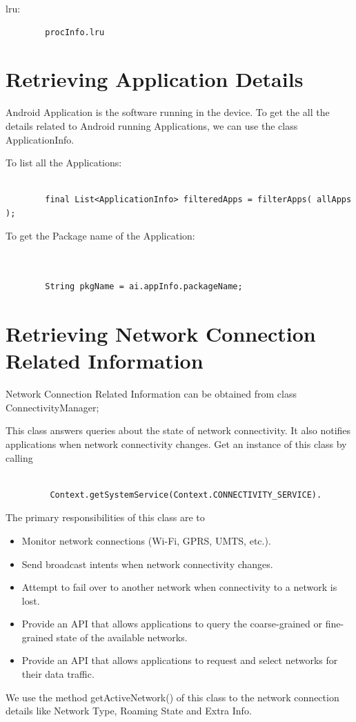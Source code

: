 \documentclass[12pt]{report}
\begin{document}
lru:

\begin{lstlisting}
        procInfo.lru
\end{lstlisting}


\section{Retrieving Application Details}
Android Application is the software running in the device. To get the all the details related to Android running Applications, we can use the class ApplicationInfo. 

To list all the Applications:
\begin{lstlisting}

        final List<ApplicationInfo> filteredApps = filterApps( allApps );
\end{lstlisting}

To get the Package name of the Application:

\begin{lstlisting}


        String pkgName = ai.appInfo.packageName;
\end{lstlisting}

\section{Retrieving Network Connection Related Information}

Network Connection Related Information can be obtained from class ConnectivityManager;

This class answers queries about the state of network connectivity. It also notifies applications when network connectivity changes. Get an instance of this class by calling
\begin{lstlisting}

         Context.getSystemService(Context.CONNECTIVITY_SERVICE).
\end{lstlisting}
The primary responsibilities of this class are to

\begin{itemize}

 	\item    Monitor network connections (Wi-Fi, GPRS, UMTS, etc.).
    \item Send broadcast intents when network connectivity changes.
    \item Attempt to fail over to another network when connectivity to a network is lost.
    \item Provide an API that allows applications to query the coarse-grained or fine-grained state of the available networks.
    \item Provide an API that allows applications to request and select networks for their data traffic.
\end{itemize}
We use the method  getActiveNetwork() of this class to the network connection details like Network Type, Roaming State and Extra Info.
\end{document}
